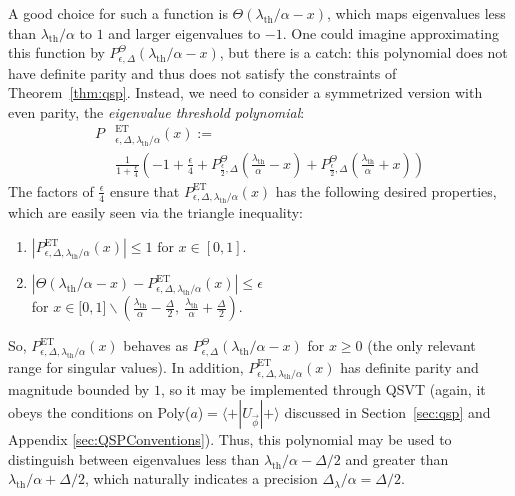 \documentclass[aps,pra,showpacs,notitlepage,twocolumn,superscriptaddress,nofootinbib]{revtex4-1}
\begin{document}
    A good choice for such a function is $\Theta(\lambda_{\text{th}}/\alpha-x)$, which maps eigenvalues less than $\lambda_{\text{th}}/\alpha$ to $1$ and larger eigenvalues to $-1$. One could imagine approximating this function by $P^{\Theta}_{\epsilon, \Delta}(\lambda_{\text{th}}/\alpha-x)$, but there is a catch: this polynomial does not have definite parity and thus does not satisfy the constraints of Theorem~\ref{thm:qsp}. Instead, we need to consider a symmetrized version with even parity, the \emph{eigenvalue threshold polynomial}:
        \begin{equation}
        \begin{split}
            P&^{\text{ET}}_{\epsilon,\Delta,\lambda_{\text{th}}/\alpha}(x)  := \\
            &\frac{1}{1+\frac{\epsilon}{4}} \left( -1+\frac{\epsilon}{4} +  P^{\Theta}_{\frac{\epsilon}{2},\Delta}\left(\tfrac{\lambda_{\text{th}}}{\alpha} - x \right) + P^{\Theta}_{\frac{\epsilon}{2},\Delta}\left(\tfrac{\lambda_{\text{th}}}{\alpha} + x \right) \right)
        \end{split}
        \end{equation}
    The factors of $\frac{\epsilon}{4}$ ensure that $P^{\text{ET}}_{\epsilon,\Delta,\lambda_{\text{th}}/\alpha}(x)$ has the following desired properties, which are easily seen via the triangle inequality:
        \begin{enumerate}
            \item $|P^{\text{ET}}_{\epsilon,\Delta,\lambda_{\text{th}}/\alpha}(x)|\leq 1 \text{ for } x \in [0,1]$.
            \item $|\Theta(\lambda_{\text{th}}/\alpha-x) - P^{\text{ET}}_{\epsilon,\Delta,\lambda_{\text{th}}/\alpha}(x)| \leq \epsilon$ \\ for $x \in \big[ 0,1 \big] \backslash \left(\frac{\lambda_{\text{th}}}{\alpha}-\frac{\Delta}{2}, \ \frac{\lambda_{\text{th}}}{\alpha}+\frac{\Delta}{2}\right)$.
        \end{enumerate}
    So, $P^{\text{ET}}_{\epsilon,\Delta,\lambda_{\text{th}}/\alpha}(x)$ behaves as $P^{\Theta}_{\epsilon,\Delta}(\lambda_{\text{th}}/\alpha-x)$ for $x\geq 0$ (the only relevant range for singular values). In addition, $P^{\text{ET}}_{\epsilon,\Delta,\lambda_{\text{th}}/\alpha}(x)$ has definite parity and magnitude bounded by $1$, so it may be implemented through QSVT (again, it obeys the conditions on Poly($a$)$= \langle + | U_{\vec{\phi}} | +\rangle$ discussed in Section~\ref{sec:qsp} and Appendix \ref{sec:QSPConventions}). Thus, this polynomial may be used to distinguish between eigenvalues less than $\lambda_{\text{th}}/\alpha - \Delta/2$ and greater than $\lambda_{\text{th}}/\alpha + \Delta/2$, which naturally indicates a precision $\Delta_\lambda/\alpha = \Delta/2$.
    
\end{document}
